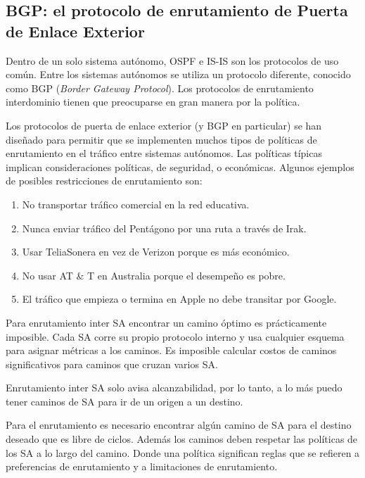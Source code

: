 \documentclass[10pt,a4paper]{report}
\begin{document}
\subsection{BGP: el protocolo de enrutamiento de Puerta de Enlace Exterior}
	
	\par Dentro de un solo sistema autónomo, OSPF e IS-IS son los protocolos de uso común. Entre los sistemas autónomos se utiliza un protocolo diferente, conocido como BGP (\textit{Border Gateway Protocol}). Los protocolos de enrutamiento interdominio tienen que preocuparse en gran manera por la política.
	
	\par Los protocolos de puerta de enlace exterior (y BGP en particular) se han diseñado para permitir que se implementen muchos tipos de políticas de enrutamiento en el tráfico entre sistemas autónomos. Las políticas típicas implican consideraciones políticas, de seguridad, o económicas. Algunos ejemplos de posibles restricciones de enrutamiento son:
		\begin{enumerate}
			\item  No transportar tráfico comercial en la red educativa.
			\item Nunca enviar tráfico del Pentágono por una ruta a través de Irak.
			\item Usar TeliaSonera en vez de Verizon porque es más económico.
			\item No usar AT \& T en Australia porque el desempeño es pobre.
			\item El tráfico que empieza o termina en Apple no debe transitar por Google.
		\end{enumerate}

	\par Para enrutamiento inter SA encontrar un camino óptimo es prácticamente 
	imposible. Cada SA corre su propio protocolo interno y usa cualquier esquema para 
	asignar métricas a los caminos. Es imposible calcular costos de caminos 
	significativos para caminos que cruzan varios SA.
	\par Enrutamiento inter SA solo avisa alcanzabilidad, por lo tanto, a lo más puedo 
	tener caminos de SA para ir de un origen a un destino.
	
	\par Para el enrutamiento es necesario encontrar algún camino de SA para el destino 
	deseado que es libre de ciclos. Además los caminos deben respetar las políticas de 
	los SA a lo largo del camino. Donde una política significan reglas que se refieren a 
	preferencias de enrutamiento y a limitaciones de enrutamiento.
   
\end{document}
